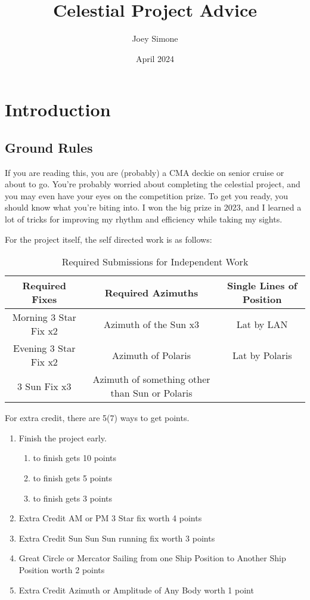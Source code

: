 \documentclass[letterpaper,12pt]{article}
\title{Celestial Project Advice}
\author{Joey Simone}
\date{April 2024}
\begin{document}
\maketitle
\section{Introduction}
\subsection{Ground Rules}
If you are reading this, you are (probably) a CMA deckie on senior cruise or about to go. You're probably worried about completing the celestial project, and you may even have your eyes on the competition prize. To get you ready, you should know what you're biting into. I won the big prize in 2023, and I learned a lot of tricks for improving my rhythm and efficiency while taking my sights.

For the project itself, the self directed work is as follows:


\begin{table}[htbp]
    \centering
    \begin{tabular}{|c|c|c|}
    \hline
        Required Fixes & Required Azimuths & Single Lines of Position\\
        \hline
        Morning 3 Star Fix x2 & Azimuth of the Sun x3\footnotemark{} & Lat by LAN\\
        Evening 3 Star Fix x2 & Azimuth of Polaris & Lat by Polaris \\
        3 Sun Fix x3 & Azimuth of something other than Sun or Polaris & \\
        \hline
    \end{tabular}
    \caption{Required Submissions for Independent Work}
    \label{tab:solo}
\end{table}
For extra credit, there are 5(7) ways to get points.
\begin{enumerate}
    \item Finish the project early. \begin{enumerate}
        \item {} to finish gets 10 points
        \item {} to finish gets 5 points
        \item {} to finish gets 3 points
    \end{enumerate}
    \item Extra Credit AM or PM 3 Star fix worth 4 points
    \item Extra Credit Sun Sun Sun running fix worth 3 points
    \item Great Circle or Mercator Sailing from one Ship Position to Another Ship Position worth 2 points
    \item Extra Credit Azimuth or Amplitude of Any Body worth 1 point
\end{enumerate}
\end{document}
